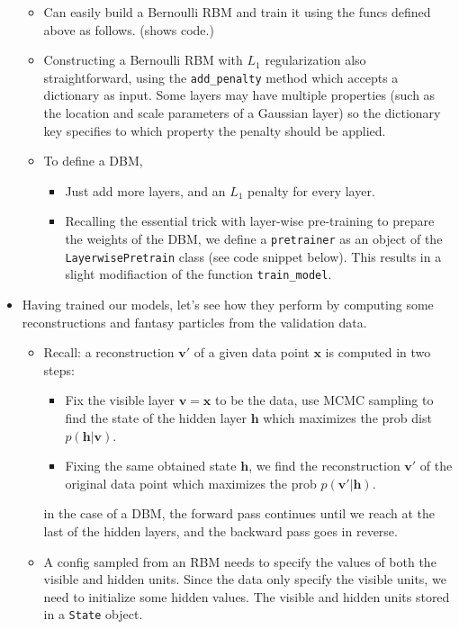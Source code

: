 \documentclass[norsk,a4paper,11pt]{article}
\begin{document}
\begin{itemize}
\begin{itemize}
\begin{itemize}
		\end{itemize}
		\item Can easily build a Bernoulli RBM and train it using the funcs defined above as follows. (shows code.)
		\item Constructing a Bernoulli RBM with $L_1$ regularization also straightforward, using the \texttt{add\_penalty} method which accepts a dictionary as input. Some layers may have multiple properties (such as the location and scale parameters of a Gaussian layer) so the dictionary key specifies to which property the penalty should be applied.
		\item To define a DBM, 
		\begin{itemize}
			\item Just add more layers, and an $L_1$ penalty for every layer.
			\item Recalling the essential trick with layer-wise pre-training to prepare the weights of the DBM, we define a \texttt{pretrainer} as an object of the \texttt{LayerwisePretrain} class (see code snippet below). This results in a slight modifiaction of the function \texttt{train\_model}. 
		\end{itemize}
	\end{itemize}
	\item Having trained our models, let's see how they perform by computing some reconstructions and fantasy particles from the validation data.
	\begin{itemize}
		\item Recall: a reconstruction $\bm{v}'$ of a given data point $\bm{x}$ is computed in two steps:
		\begin{itemize}
			\item Fix the visible layer $\bm{v} = \bm{x}$ to be the data, use MCMC sampling to find the state of the hidden layer $\bm{h}$ which maximizes the prob dist $p(\bm{h}|\bm{v})$.
			\item Fixing the same obtained state $\bm{h}$, we find the reconstruction $\bm{v}'$ of the original data point which maximizes the prob $p(\bm{v}' |\bm{h})$.
		\end{itemize}
		in the case of a DBM, the forward pass continues until we reach at the last of the hidden layers, and the backward pass goes in reverse.
		\item A config sampled from an RBM needs to specify the values of both the visible and hidden units. Since the data only specify the visible units, we need to initialize some hidden values. The visible and hidden units stored in a \texttt{State} object. 

\end{itemize}
\end{itemize}
\end{document}
